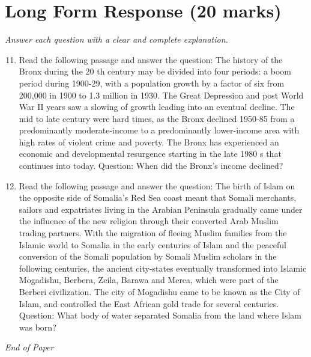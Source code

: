 \documentclass[12pt]{article}
\begin{document}
\section*{Long Form Response (20 marks)}
\textit{Answer each question with a clear and complete explanation.}
\begin{enumerate}[label=\arabic*.]
\setcounter{enumi}{10}
\item Read the following passage and answer the question: The history of the Bronx during the 20 th century may be divided into four periods: a boom period during 1900-29, with a population growth by a factor of six from 200,000 in 1900 to 1.3 million in 1930. The Great Depression and post World War II years saw a slowing of growth leading into an eventual decline. The mid to late century were hard times, as the Bronx declined 1950-85 from a predominantly moderate-income to a predominantly lower-income area with high rates of violent crime and poverty. The Bronx has experienced an economic and developmental resurgence starting in the late 1980 s that continues into today. Question: When did the Bronx's income declined?
\item Read the following passage and answer the question: The birth of Islam on the opposite side of Somalia's Red Sea coast meant that Somali merchants, sailors and expatriates living in the Arabian Peninsula gradually came under the influence of the new religion through their converted Arab Muslim trading partners. With the migration of fleeing Muslim families from the Islamic world to Somalia in the early centuries of Islam and the peaceful conversion of the Somali population by Somali Muslim scholars in the following centuries, the ancient city-states eventually transformed into Islamic Mogadishu, Berbera, Zeila, Barawa and Merca, which were part of the Berberi civilization. The city of Mogadishu came to be known as the City of Islam, and controlled the East African gold trade for several centuries. Question: What body of water separated Somalia from the land where Islam was born?
\end{enumerate}

\vfill
\noindent\textit{End of Paper}
\end{document}
